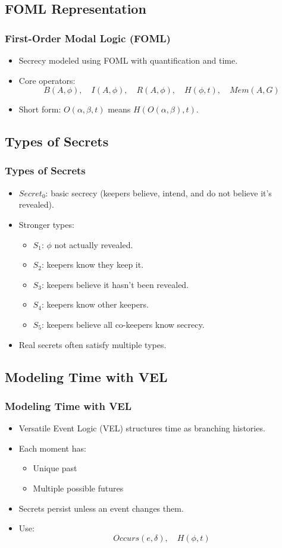 \documentclass[aspectratio=169]{beamer}
\begin{document}
\subsection{FOML Representation}
\begin{frame}
\frametitle{First-Order Modal Logic (FOML)}
\begin{itemize}
    \item Secrecy modeled using FOML with quantification and time.
    \item Core operators:
    \[
    B(A, \phi), \quad I(A, \phi), \quad R(A, \phi), 
    \quad H(\phi, t), \quad Mem(A, G)
    \]
    \item Short form: $O(\alpha, \beta, t)$ means $H(O(\alpha, \beta), t)$.
\end{itemize}
\end{frame}

\subsection{Types of Secrets}
\begin{frame}
\frametitle{Types of Secrets}
\begin{itemize}
    \item $Secret_0$: basic secrecy (keepers believe, intend, and do not believe it's revealed).
    \item Stronger types:
    \begin{itemize}
        \item $S_1$: $\phi$ not actually revealed.
        \item $S_2$: keepers know they keep it.
        \item $S_3$: keepers believe it hasn't been revealed.
        \item $S_4$: keepers know other keepers.
        \item $S_5$: keepers believe all co-keepers know secrecy.
    \end{itemize}
    \item Real secrets often satisfy multiple types.
\end{itemize}
\end{frame}

\subsection{Modeling Time with VEL}
\begin{frame}
\frametitle{Modeling Time with VEL}
\begin{itemize}
    \item Versatile Event Logic (VEL) structures time as branching histories.
    \item Each moment has:
    \begin{itemize}
        \item Unique past
        \item Multiple possible futures
    \end{itemize}
    \item Secrets persist unless an event changes them.
    \item Use:
    \[
    Occurs(e, \delta), \quad H(\phi, t)
    \]
\end{itemize}
\end{frame}
\end{document}
